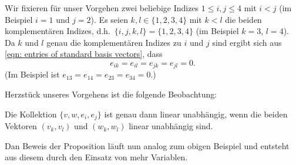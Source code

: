 \documentclass[a4paper,10pt]{article}
\begin{document}
Wir fixieren für unser Vorgehen zwei beliebige Indizes $1 \leq i,j \leq 4$ mit $i < j$ (im Beispiel $i = 1$ und $j = 2$). Es seien $k, l \in \{1,2,3,4\}$ mit $k < l$ die beiden komplementären Indizes, d.h.\ $\{i,j,k,l\} = \{1,2,3,4\}$ (im Beispiel $k = 3$, $l = 4$). Da $k$ und $l$ genau die komplementären Indizes zu $i$ und $j$ sind ergibt sich aus \eqref{eqn: entries of standard basis vectors}, dass
\begin{equation}\label{eqn: zero entries in the standard basis vectors}
 e_{ik} = e_{il} = e_{jk} = e_{jl} = 0.
\end{equation}
(Im Beispiel ist $e_{13} = e_{14} = e_{23} = e_{34} = 0$.)

Herzstück unseres Vorgehens ist die folgende Beobachtung:

\begin{prop}\label{prop: everything in abstract}
 Die Kollektion $\{v,w,e_i,e_j\}$ ist genau dann linear unabhängig, wenn die beiden Vektoren $(v_k, v_l)$ und $(w_k,w_l)$ linear unabhängig sind.
\end{prop}

Dan Beweis der Proposition läuft nun analog zum obigen Beispiel und entsteht aus diesem durch den Einsatz von mehr Variablen.
\end{document}
